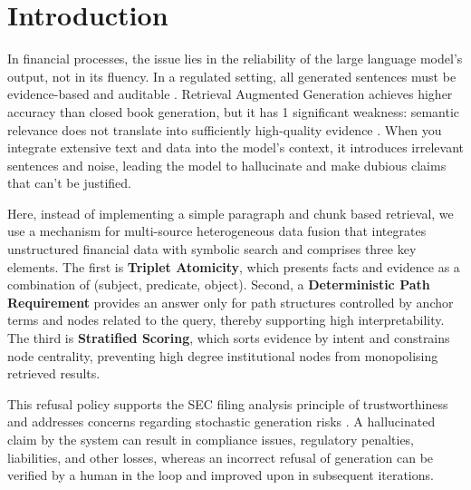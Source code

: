 \documentclass[conference]{IEEEtran}
\begin{document}
\section{Introduction}
In financial processes, the issue lies in the reliability of the large language model's output, not in its fluency. In a regulated setting, all generated sentences must be evidence-based and auditable \cite{basel,gdpr,sr117,bcbs239,iso27001,pci40}. Retrieval Augmented Generation achieves higher accuracy than closed book generation, but it has 1 significant weakness: semantic relevance does not translate into sufficiently high-quality evidence \cite{lewis2020rag,karpukhin2020dpr,colbert2020,splade2021,atlas2022}. When you integrate extensive text and data into the model's context, it introduces irrelevant sentences and noise, leading the model to hallucinate and make dubious claims that can't be justified.

Here, instead of implementing a simple paragraph and chunk based retrieval, we use a mechanism for multi-source heterogeneous data fusion that integrates unstructured financial data with symbolic search and comprises three key elements. The first is \textbf{Triplet Atomicity}, which presents facts and evidence as a combination of (subject, predicate, object). Second, a \textbf{Deterministic Path Requirement} provides an answer only for path structures controlled by anchor terms and nodes related to the query, thereby supporting high interpretability. The third is \textbf{Stratified Scoring}, which sorts evidence by intent and constrains node centrality, preventing high degree institutional nodes from monopolising retrieved results.

This refusal policy supports the SEC filing analysis principle of trustworthiness \cite{sec10k,projectnotes} and addresses concerns regarding stochastic generation risks \cite{bender2021stochastic}. A hallucinated claim by the system can result in compliance issues, regulatory penalties, liabilities, and other losses, whereas an incorrect refusal of generation can be verified by a human in the loop and improved upon in subsequent iterations.
\end{document}

